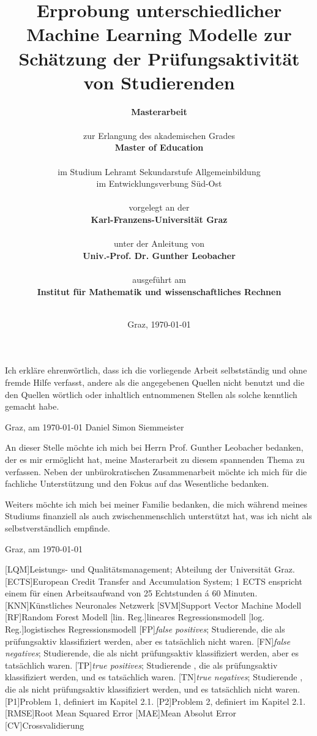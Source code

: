 \documentclass[
    fontsize=12pt,
    paper=A4,
    parskip=full, %
    bibliography=totoc,
    abstract=on,
    listof=totoc,
]{scrreprt} %
\title{
        {Erprobung unterschiedlicher Machine Learning Modelle zur Sch\"atzung der Pr\"ufungsaktivit\"at von Studierenden}
        }
\author{
        
        \Huge{\textbf{Masterarbeit}} \\
        \ \\
        \large{zur Erlangung des akademischen Grades} \\
        \large{\textbf{Master of Education}}\\ 
        \\
        \large{im Studium Lehramt Sekundarstufe Allgemeinbildung}\\
        \large{im Entwicklungsverbung Süd-Ost}\\
        \ \\
        \large{vorgelegt an der} \\
        \large{\textbf{Karl-Franzens-Universität Graz}}\\
        \\
        \large{unter der Anleitung von} \\
        \large{\textbf{Univ.-Prof. Dr. Gunther Leobacher}} \\
        \\
        \large{ausgef\"uhrt am}\\
        \large{\textbf{Institut f\"ur Mathematik und wissenschaftliches Rechnen}}
        \\
        \\
        }
\date{ \normalsize{Graz, \today{}}}
\begin{document}
\begin{singlespace}
    \maketitle
    \setcounter{page}{2}
\end{singlespace}



Ich erkläre ehrenwörtlich, dass ich die vorliegende Arbeit selbstständig und ohne
fremde Hilfe verfasst, andere als die angegebenen Quellen nicht benutzt und die den
Quellen wörtlich oder inhaltlich entnommenen Stellen als solche kenntlich gemacht
habe. 

Graz, am \today{} \hfill Daniel Simon Siemmeister


An dieser Stelle m\"ochte ich mich bei Herrn Prof. Gunther Leobacher bedanken, der es mir erm\"oglicht hat, meine Masterarbeit zu
diesem spannenden Thema zu verfassen. Neben der unb\"urokratischen Zusammenarbeit m\"ochte ich mich f\"ur die fachliche
Unterst\"utzung und den Fokus auf das Wesentliche bedanken.

Weiters m\"ochte ich mich bei meiner Familie bedanken, die mich w\"ahrend meines Studiums finanziell als auch zwischenmenschlich unterst\"utzt hat, 
was ich nicht als selbstverst\"andlich empfinde.

Graz, am \today{}


\tableofcontents %


\begin{acronym}
    [LQM]{Leistungs- und Qualit\"atsmanagement; Abteilung der Universität Graz.}
    [ECTS]{European Credit Transfer and Accumulation System; 1 ECTS enspricht einem f\"ur einen Arbeitsaufwand von 25 Echtstunden \'a 60 Minuten.}
    [KNN]{K\"unstliches Neuronales Netzwerk}
    [SVM]{Support Vector Machine Modell}
    [RF]{Random Forest Modell}
    [lin. Reg.]{lineares Regressionsmodell}
    [log. Reg.]{logistisches Regressionsmodell}
    [FP]{\textit{false positives}; Studierende, die als pr\"ufungsaktiv klassifiziert werden, aber es tats\"achlich nicht waren.}
    [FN]{\textit{false negatives}; Studierende, die als nicht pr\"ufungsaktiv klassifiziert werden, aber es tats\"achlich waren.}
    [TP]{\textit{true positives}; Studierende , die als pr\"ufungsaktiv klassifiziert werden, und es tats\"achlich waren.}
    [TN]{\textit{true negatives}; Studierende , die als nicht pr\"ufungsaktiv klassifiziert werden, und es tats\"achlich nicht waren.}
    [P1]{Problem 1, definiert im Kapitel 2.1.}
    [P2]{Problem 2, definiert im Kapitel 2.1.}
    [RMSE]{Root Mean Squared Error}
    [MAE]{Mean Absolut Error}
    [CV]{Crossvalidierung}

\end{acronym}
\end{document}
